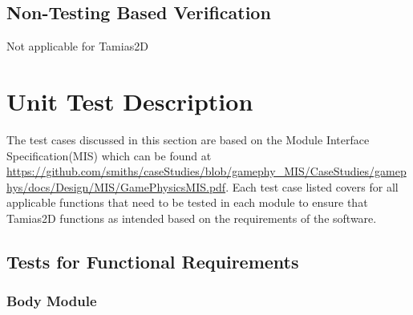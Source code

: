 \documentclass[12pt, titlepage]{article}
\newcommand{\progname}{Tamias2D}
\begin{document}
\subsection{Non-Testing Based Verification}
Not applicable for \progname


\section{Unit Test Description}
The test cases discussed in this section are based on the Module Interface Specification(MIS) which can be found at \url{https://github.com/smiths/caseStudies/blob/gamephy_MIS/CaseStudies/gamephys/docs/Design/MIS/GamePhysicsMIS.pdf}. Each test case listed covers for all applicable functions that need to be tested in each module to ensure that \progname{} functions as intended based on the requirements of the software.
	
\subsection{Tests for Functional Requirements}

\subsubsection{Body Module}
		
\end{document}

